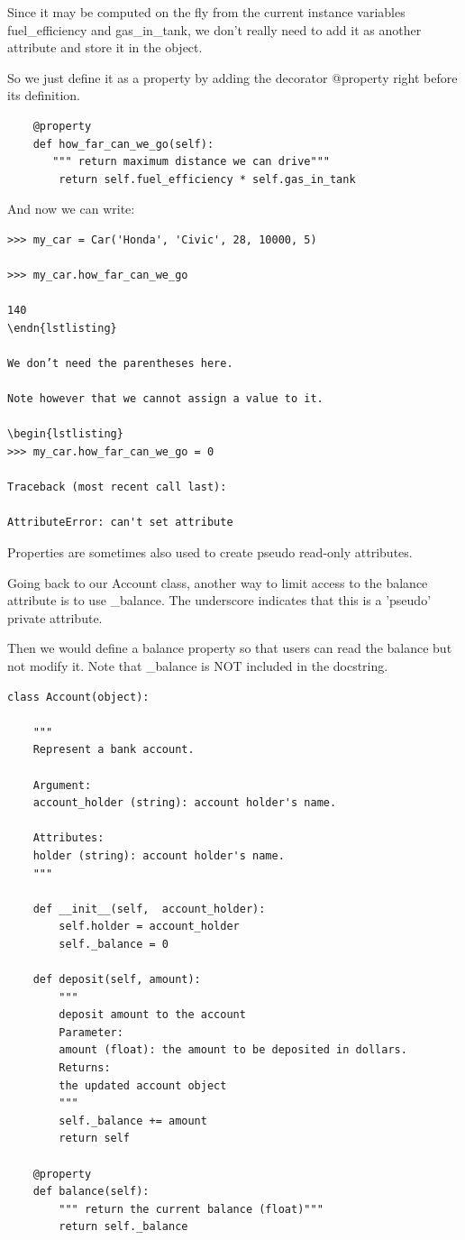 \documentclass{article}
\begin{document}
Since it may be computed on the fly from the current instance variables fuel{\_}efficiency and gas{\_}in{\_}tank, we don’t really need to add it as another attribute and store it in the object.

So we just define it as a property by adding the decorator @property right before its definition.

\begin{lstlisting}
    @property
    def how_far_can_we_go(self):
       """ return maximum distance we can drive"""
        return self.fuel_efficiency * self.gas_in_tank
\end{lstlisting}
 
And now we can write:

\begin{lstlisting}
>>> my_car = Car('Honda', 'Civic', 28, 10000, 5)

>>> my_car.how_far_can_we_go

140
\endn{lstlisting}

We don’t need the parentheses here.

Note however that we cannot assign a value to it.

\begin{lstlisting}
>>> my_car.how_far_can_we_go = 0

Traceback (most recent call last):

AttributeError: can't set attribute
\end{lstlisting}

Properties are sometimes also used to create pseudo read-only attributes.

Going back to our Account class, another way to limit access to the balance attribute is to use {\_}balance.  The underscore indicates that this is a 'pseudo' private attribute.

Then we would define a balance property so that users can read the balance but not modify it.  Note that {\_}balance is NOT included in the docstring.

\begin{lstlisting}
class Account(object):
 
    """
    Represent a bank account.
 
    Argument:
    account_holder (string): account holder's name.
 
    Attributes:
    holder (string): account holder's name.
    """
 
    def __init__(self,  account_holder):
        self.holder = account_holder
        self._balance = 0
 
    def deposit(self, amount):
        """
        deposit amount to the account
        Parameter:
        amount (float): the amount to be deposited in dollars.
        Returns:
        the updated account object
        """
        self._balance += amount
        return self
 
    @property
    def balance(self):
        """ return the current balance (float)"""
        return self._balance
\end{lstlisting}
\end{document}
